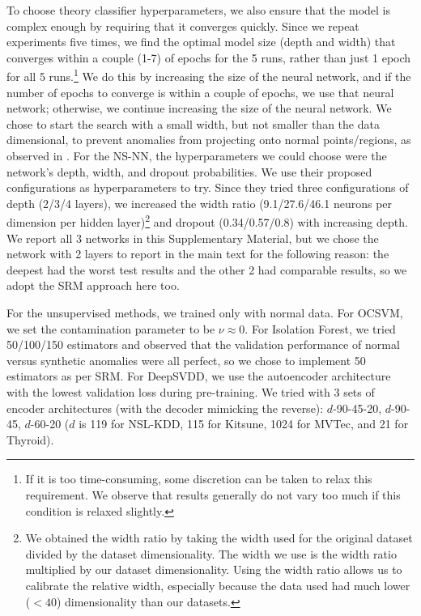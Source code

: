 \documentclass{article}
\begin{document}
To choose theory classifier hyperparameters, we also ensure that the model is complex enough by requiring that it converges quickly.
Since we repeat experiments five times, we find the optimal model size (depth and width) that converges within a couple (1-7) of epochs for the 5 runs, rather than just 1 epoch for all 5 runs.\footnote{If it is too time-consuming, some discretion can be taken to relax this requirement. We observe that results generally do not vary too much if this condition is relaxed slightly.}
We do this by increasing the size of the neural network, and if the number of epochs to converge is within a couple of epochs, we use that neural network; otherwise, we continue increasing the size of the neural network.
We chose to start the search with a small width, but not smaller than the data dimensional, to prevent anomalies from projecting onto normal points/regions, as observed in \citet{lau2024geometric_OSR}.
For the NS-NN, the hyperparameters we could choose were the network's depth, width, and dropout probabilities.
We use their proposed configurations as hyperparameters to try.
Since they tried three configurations of depth (2/3/4 layers), we increased the width ratio (9.1/27.6/46.1 neurons per dimension per hidden layer)\footnote{We obtained the width ratio by taking the width used for the original dataset divided by the dataset dimensionality. The width we use is the width ratio multiplied by our dataset dimensionality. Using the width ratio allows us to calibrate the relative width, especially because the data \citet{sipple20NSNN} used had much lower ($<40$) dimensionality than our datasets.} and dropout (0.34/0.57/0.8) with increasing depth.
We report all 3 networks in this Supplementary Material, but we chose the network with 2 layers to report in the main text for the following reason:
the deepest had the worst test results and the other 2 had comparable results, so we adopt the SRM approach here too. 

For the unsupervised methods, we trained only with normal data.
For OCSVM, we set the contamination parameter to be $\nu\approx 0$.
For Isolation Forest, we tried 50/100/150 estimators and observed that the validation performance of normal versus synthetic anomalies were all perfect, so we chose to implement 50 estimators as per SRM.
For DeepSVDD, we use the autoencoder architecture with the lowest validation loss during pre-training.
We tried with 3 sets of encoder architectures (with the decoder mimicking the reverse): $d$-90-45-20, $d$-90-45, $d$-60-20 ($d$ is 119 for NSL-KDD, 115 for Kitsune, 1024 for MVTec, and 21 for Thyroid).
\end{document}

